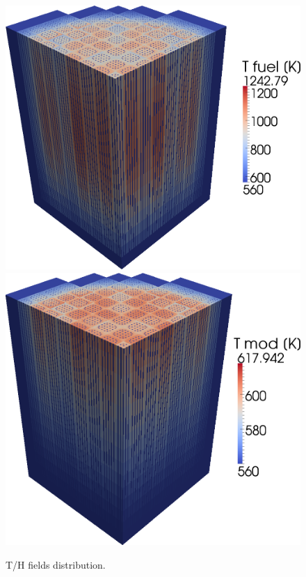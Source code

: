 \begin{figure}[!htb]
\centering
  \includegraphics[scale=.18]{mox/Tf}
  \includegraphics[scale=.18]{mox/Tm}
  \caption{T/H fields distribution.}
  \label{fig:mox6}
\end{figure}

